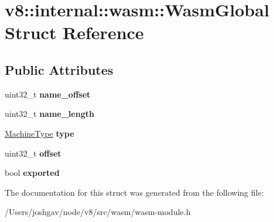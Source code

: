 \hypertarget{structv8_1_1internal_1_1wasm_1_1_wasm_global}{}\section{v8\+:\+:internal\+:\+:wasm\+:\+:Wasm\+Global Struct Reference}
\label{structv8_1_1internal_1_1wasm_1_1_wasm_global}
\subsection*{Public Attributes}
\begin{DoxyCompactItemize}
\item 
uint32\+\_\+t {\bfseries name\+\_\+offset}\hypertarget{structv8_1_1internal_1_1wasm_1_1_wasm_global_a45fa367c134738a6f0617a9da6457683}{}\label{structv8_1_1internal_1_1wasm_1_1_wasm_global_a45fa367c134738a6f0617a9da6457683}

\item 
uint32\+\_\+t {\bfseries name\+\_\+length}\hypertarget{structv8_1_1internal_1_1wasm_1_1_wasm_global_a05ee610c5f366c5094da2916a40f0291}{}\label{structv8_1_1internal_1_1wasm_1_1_wasm_global_a05ee610c5f366c5094da2916a40f0291}

\item 
\hyperlink{classv8_1_1internal_1_1_machine_type}{Machine\+Type} {\bfseries type}\hypertarget{structv8_1_1internal_1_1wasm_1_1_wasm_global_a9872efa9338e27eaa7a98da78c3c1581}{}\label{structv8_1_1internal_1_1wasm_1_1_wasm_global_a9872efa9338e27eaa7a98da78c3c1581}

\item 
uint32\+\_\+t {\bfseries offset}\hypertarget{structv8_1_1internal_1_1wasm_1_1_wasm_global_a542230c2ed200a1e8a0c6d1423a9426a}{}\label{structv8_1_1internal_1_1wasm_1_1_wasm_global_a542230c2ed200a1e8a0c6d1423a9426a}

\item 
bool {\bfseries exported}\hypertarget{structv8_1_1internal_1_1wasm_1_1_wasm_global_a92b32d07dd8f7c3cac889c1f21f0d269}{}\label{structv8_1_1internal_1_1wasm_1_1_wasm_global_a92b32d07dd8f7c3cac889c1f21f0d269}

\end{DoxyCompactItemize}


The documentation for this struct was generated from the following file\+:\begin{DoxyCompactItemize}
\item 
/\+Users/joshgav/node/v8/src/wasm/wasm-\/module.\+h\end{DoxyCompactItemize}
